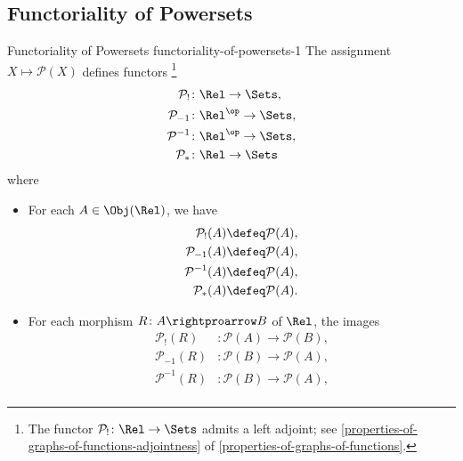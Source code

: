 \subsection{Functoriality of Powersets}\label{subsection-functoriality-of-powersets}
\begin{proposition}{Functoriality of Powersets \rmI}{functoriality-of-powersets-1}%
    The assignment $X\mapsto\mathcal{P}(X)$ defines functors%
    \footnote{%
        The functor $\mathcal{P}_{!}\colon\Rel\to\Sets$ admits a left adjoint; see \cref{properties-of-graphs-of-functions-adjointness} of \cref{properties-of-graphs-of-functions}.
        \par\vspace*{\TCBBoxCorrection}
    }%
    \begin{align*}
        \mathcal{P}_{!}  &\colon \Rel       \to \Sets,\\%
        \mathcal{P}_{-1} &\colon \Rel^{\op} \to \Sets,\\%
        \mathcal{P}^{-1} &\colon \Rel^{\op} \to \Sets,\\%
        \mathcal{P}_{*}  &\colon \Rel       \to \Sets%
    \end{align*}
    where
    \begin{itemize}
        \item{}For each $A\in\Obj(\Rel)$, we have
            \begin{align*}
                \mathcal{P}_{!}(A)  &\defeq \mathcal{P}(A),\\%
                \mathcal{P}_{-1}(A) &\defeq \mathcal{P}(A),\\%
                \mathcal{P}^{-1}(A) &\defeq \mathcal{P}(A),\\%
                \mathcal{P}_{*}(A)  &\defeq \mathcal{P}(A).%
            \end{align*}
        \item{}For each morphism $R\colon A\rightproarrow B$ of $\Rel$, the images
            \begin{align*}
                \mathcal{P}_{!}(R)  &\colon \mathcal{P}(A) \to \mathcal{P}(B),\\%
                \mathcal{P}_{-1}(R) &\colon \mathcal{P}(B) \to \mathcal{P}(A),\\%
                \mathcal{P}^{-1}(R) &\colon \mathcal{P}(B) \to \mathcal{P}(A),\\%

\end{align*}
\end{itemize}
\end{proposition}
